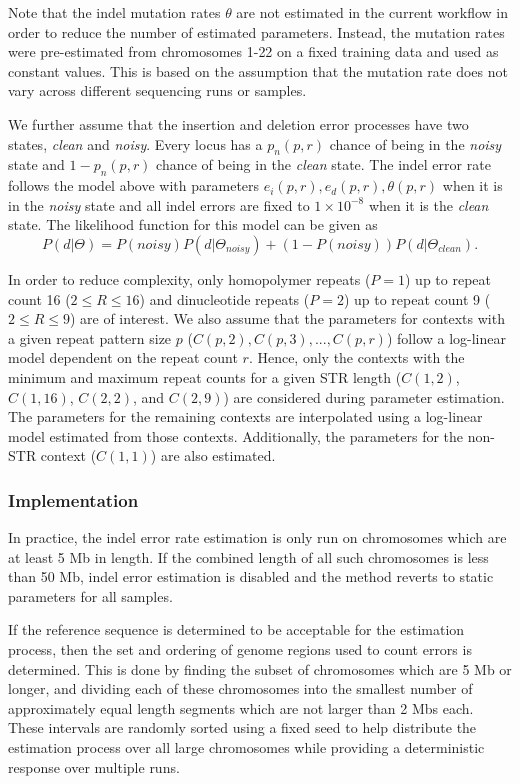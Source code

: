 \documentclass{article}
\begin{document}
Note that the indel mutation rates $\theta$ are not estimated in the current workflow in order to reduce the number of estimated parameters. Instead, the mutation rates were pre-estimated from chromosomes 1-22 on a fixed training data and used as constant values. This is based on the assumption that the mutation rate does not vary across different sequencing runs or samples.

We further assume that the insertion and deletion error processes have two states, \emph{clean} and \emph{noisy}. Every locus has a $p_n(p,r)$ chance of being in the \emph{noisy} state and $1-p_n(p,r)$ chance of being in the \emph{clean} state. The indel error rate follows the model above with parameters $e_i(p,r), e_d(p,r), \theta(p,r)$ when it is in the \emph{noisy} state and all indel errors are fixed to $1 \times 10^{-8}$ when it is the \emph{clean} state. The likelihood function for this model can be given as
\begin{equation*}
P(d \vert \Theta) = P(noisy) P (d \vert \Theta_{noisy}) + (1-P(noisy)) P (d \vert \Theta_{clean}).
\end{equation*}


In order to reduce complexity, only homopolymer repeats ($P=1$) up to repeat count 16 ($2\leq R \leq 16$) and dinucleotide repeats ($P=2$) up to repeat count 9 ($2\leq R \leq 9$) are of interest. We also assume that the parameters for contexts with a given repeat pattern size $p$ ($C(p,2),C(p,3),...,C(p,r)$) follow a log-linear model dependent on the repeat count $r$. Hence, only the contexts with the minimum and maximum repeat counts for a given STR length ($C(1,2)$, $C(1,16)$, $C(2,2)$, and $C(2,9)$) are considered during parameter estimation. The parameters for the remaining contexts are interpolated using a log-linear model estimated from those contexts. Additionally, the parameters for the non-STR context ($C(1,1)$) are also estimated.

\subsubsection{Implementation}

In practice, the indel error rate estimation is only run on chromosomes which are at least 5 Mb in length. If the combined length of all such chromosomes is less than 50 Mb, indel error estimation is disabled and the method reverts to static parameters for all samples.

If the reference sequence is determined to be acceptable for the estimation process, then the set and ordering of genome regions used to count errors is determined. This is done by finding the subset of chromosomes which are 5 Mb or longer, and dividing each of these chromosomes into the smallest number of approximately equal length segments which are not larger than 2 Mbs each. These intervals are randomly sorted using a fixed seed to help distribute the estimation process over all large chromosomes while providing a deterministic response over multiple runs.
\end{document}
